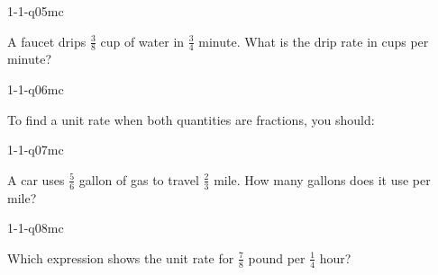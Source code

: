 \begin{practiceQuestion}{1-1-q05}{mc}
\begin{questionText}
A faucet drips $\frac{3}{8}$ cup of water in $\frac{3}{4}$ minute. What is the drip rate in cups per minute?
\end{questionText}
\end{practiceQuestion}

\begin{practiceQuestion}{1-1-q06}{mc}
\begin{questionText}
To find a unit rate when both quantities are fractions, you should:
\end{questionText}
\end{practiceQuestion}

\begin{practiceQuestion}{1-1-q07}{mc}
\begin{questionText}
A car uses $\frac{5}{6}$ gallon of gas to travel $\frac{2}{3}$ mile. How many gallons does it use per mile?
\end{questionText}
\end{practiceQuestion}

\begin{practiceQuestion}{1-1-q08}{mc}
\begin{questionText}
Which expression shows the unit rate for $\frac{7}{8}$ pound per $\frac{1}{4}$ hour?
\end{questionText}
\end{practiceQuestion}

